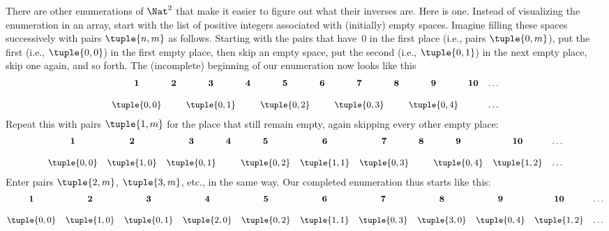 \documentclass[../../../include/open-logic-section]{subfiles}
\begin{document}


\begin{explain}
There are other enumerations of $\Nat^2$ that make it easier to
figure out what their inverses are. Here is one. Instead of
visualizing the enumeration in an array, start with the list of
positive integers associated with (initially) empty spaces. Imagine
filling these spaces successively with pairs $\tuple{n,m}$ as follows.
Starting with the pairs that have~$0$ in  the first place (i.e., pairs
$\tuple{0,m}$), put the first (i.e., $\tuple{0,0}$) in the first empty
place, then skip an empty space, put the second (i.e., $\tuple{0,1}$)
in the next empty place, skip one again, and so forth. The
(incomplete) beginning of our enumeration now looks like this
\[\small
\begin{array}{@{}c c c c c c c c c c c@{}}
\mathbf 1 & \mathbf 2 & \mathbf 3 & \mathbf 4 & \mathbf 5 & \mathbf 6 & \mathbf 7 & \mathbf 8 & \mathbf 9 & \mathbf{10} & \dots \\ \\
\tuple{0,0} &  & \tuple{0,1} &  & \tuple{0,2} &  & \tuple{0,3} & & \tuple{0,4} &  & \dots \\
\end{array}
\]
Repeat this with pairs $\tuple{1,m}$ for the place that still remain
empty, again skipping every other empty place:
\[\small
\begin{array}{@{}c c c c c c c c c c c@{}}
\mathbf 1 & \mathbf 2 & \mathbf 3 & \mathbf 4 & \mathbf 5 & \mathbf 6 & \mathbf 7 & \mathbf 8 & \mathbf 9 & \mathbf{10} & \dots \\ \\
\tuple{0,0} & \tuple{1,0} & \tuple{0,1} &  & \tuple{0,2} & \tuple{1,1} & 
\tuple{0,3} & & \tuple{0,4} &  \tuple{1,2} & \dots \\
\end{array}
\]
Enter pairs $\tuple{2,m}$, $\tuple{3,m}$, etc., in the same way. Our
completed enumeration thus starts like this:
\[\small
\begin{array}{@{}cc c c c c c c c c c@{}}
\mathbf 1 & \mathbf 2 & \mathbf 3 & \mathbf 4 & \mathbf 5 & \mathbf 6 & \mathbf 7 & \mathbf 8 & \mathbf 9 & \mathbf{10} & \dots \\ \\
\tuple{0,0} & \tuple{1,0} & \tuple{0,1} & \tuple{2,0}  & \tuple{0,2} & 
\tuple{1,1} & \tuple{0,3} & \tuple{3,0}  & \tuple{0,4} &  \tuple{1,2} & \dots \\

\end{array}\]
\end{explain}
\end{document}
